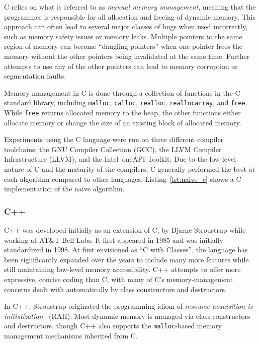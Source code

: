 C relies on what is referred to as \textit{manual memory management}, meaning that the programmer is responsible for all allocation and freeing of dynamic memory. This approach can often lead to several major classes of bugs when used incorrectly, such as memory safety issues or memory leaks. Multiple pointers to the same region of memory can become ``dangling pointers'' when one pointer frees the memory without the other pointers being invalidated at the same time. Further attempts to use any of the other pointers can lead to memory corruption or segmentation faults.

Memory management in C is done through a collection of functions in the C standard library, including \texttt{malloc}, \texttt{calloc}, \texttt{realloc}, \texttt{reallocarray}, and \texttt{free}. While \texttt{free} returns allocated memory to the heap, the other functions either allocate memory or change the size of an existing block of allocated memory.

Experiments using the C language were run on three different compiler toolchains: the GNU Compiler Collection (GCC), the LLVM Compiler Infrastructure (LLVM), and the Intel\textregistered~oneAPI Toolkit. Due to the low-level nature of C and the maturity of the compilers, C generally performed the best at each algorithm compared to other languages. Listing~\ref{lst:naive_c} shows a C implementation of the naive algorithm.



\subsubsection{C++}

C++ was developed initially as an extension of C, by Bjarne Stroustrup while working at AT\&T Bell Labs. It first appeared in 1985 and was initially standardized in 1998. At first envisioned as ``C with Classes'', the language has been significantly expanded over the years to include many more features while still maintaining low-level memory accessibility. C++ attempts to offer more expressive, concise coding than C, with many of C's memory-management concerns dealt with automatically by class constructors and destructors.

In C++, Stroustrup originated the programming idiom of \textit{resource acquisition is initialization}~\cite{cpp} (RAII). Most dynamic memory is managed via class constructors and destructors, though C++ also supports the \texttt{malloc}-based memory management mechanisms inherited from C.

